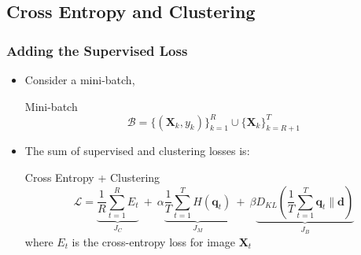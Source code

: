 \subsection{Cross Entropy and Clustering}
\begin{frame}
	\frametitle{Adding the Supervised Loss}
	\begin{itemize}
		\item Consider a mini-batch, 
			\begin{block}{Mini-batch}
				\begin{equation*}
					\mathcal{B} = \{(\mathbf{X}_k, y_k)\}_{k=1}^R \cup \{\mathbf{X}_k\}_{k=R+1}^T
				\end{equation*}
			\end{block}
		\item The sum of supervised and clustering losses is:
			\begin{block}{Cross Entropy + Clustering}
				\begin{equation*}
					\mathcal{L} = \underbrace{\frac{1}{R} \sum_{t=1}^{R} E_t}_{J_C} ~+~ \alpha
					\underbrace{\frac{1}{T}\sum_{t=1}^{T}H(\mathbf{q}_t)}_{J_M} ~+~
					\beta \underbrace{D_{KL}(\frac{1}{T}\sum_{t=1}^{T}\mathbf{q}_t \lVert
					\mathbf{d})}_{J_B}
				\end{equation*}
				where $E_t$ is the cross-entropy loss for image $\mathbf{X}_t$
			\end{block}
	\end{itemize}
\end{frame}

